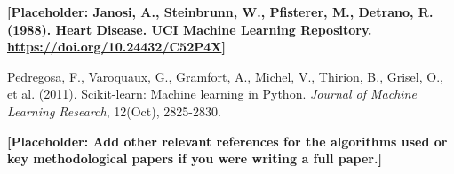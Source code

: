 \documentclass{article}
\begin{document}
\begin{thebibliography}{9}
    \textbf{[Placeholder: Janosi, A., Steinbrunn, W., Pfisterer, M., Detrano, R. (1988). Heart Disease. UCI Machine Learning Repository. \url{https://doi.org/10.24432/C52P4X}]} %

    Pedregosa, F., Varoquaux, G., Gramfort, A., Michel, V., Thirion, B., Grisel, O., et al. (2011). Scikit-learn: Machine learning in Python. \textit{Journal of Machine Learning Research}, 12(Oct), 2825-2830.

    \textbf{[Placeholder: Add other relevant references for the algorithms used or key methodological papers if you were writing a full paper.]}
\end{thebibliography}
\end{document}
